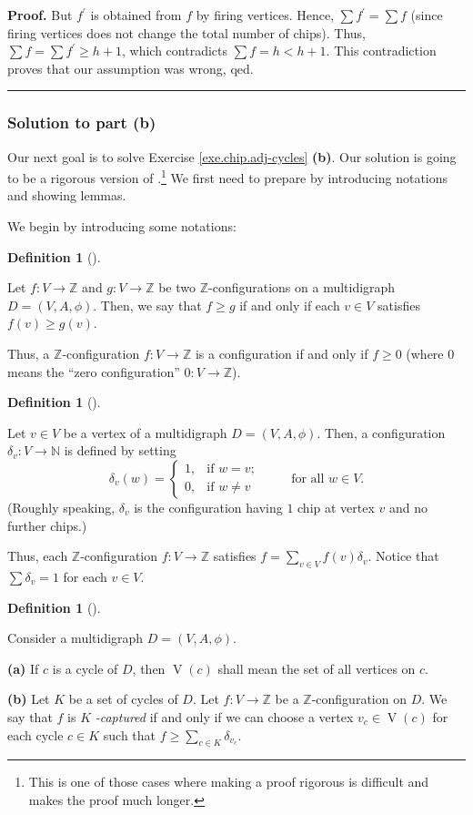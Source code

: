 \documentclass[numbers=enddot,12pt,final,onecolumn,notitlepage]{scrartcl}%
\theoremstyle{definition}
\newtheorem{defi}[theo]{Definition}
\newenvironment{definition}[1][]
{\begin{defi}[#1]\begin{leftbar}}
{\end{leftbar}\end{defi}}
\newenvironment{proof}[1][Proof]{\noindent\textbf{#1.} }{\ \rule{0.5em}{0.5em}}
\let\sumnonlimits\sum
\renewcommand{\sum}{\sumnonlimits\limits}
\newcommand{\ZZ}{\mathbb{Z}}
\newcommand{\tup}[1]{\left( #1 \right)}
\begin{document}
\begin{proof}
But $f^{\prime}$ is obtained from $f$ by firing vertices. Hence, $\sum
f^{\prime}=\sum f$ (since firing vertices does not change the total number of
chips). Thus, $\sum f=\sum f^{\prime}\geq h+1$, which contradicts $\sum
f=h<h+1$. This contradiction proves that our assumption was wrong, qed.
\end{proof}

\subsubsection{Solution to part \textbf{(b)}}

Our next goal is to solve Exercise \ref{exe.chip.adj-cycles} \textbf{(b)}.
Our solution is going to be a rigorous version of
\cite[proof of Theorem 2.2]{BjoLov92}.\footnote{This is one of
  those cases where
  making a proof rigorous is difficult and makes the proof
  much longer.}
We first need to prepare by introducing notations and showing lemmas.

We begin by introducing some notations:

\begin{definition}
Let $f : V \to \ZZ$ and $g : V \to \ZZ$ be two
$\ZZ$-configurations on a multidigraph $D = \tup{V, A, \phi}$.
Then, we say that $f\geq g$ if and only if each $v \in V$
satisfies $f \tup{v} \geq g \tup{v}$.
\end{definition}

Thus, a $\ZZ$-configuration $f : V \to \ZZ$ is a
configuration if and only if $f \geq 0$ (where $0$ means the
``zero configuration'' $0 : V \to \ZZ$).

\begin{definition}
Let $v\in V$ be a vertex of a multidigraph $D=\left(  V,A,\phi
\right)  $. Then, a configuration $\delta_{v}:V\rightarrow\mathbb{N}$ is
defined by setting
\[
\delta_{v}\left(  w\right)  =%
\begin{cases}
1, & \text{if }w=v;\\
0, & \text{if }w\neq v
\end{cases}
\qquad\text{ for all }w\in V.
\]
(Roughly speaking, $\delta_{v}$ is the configuration having $1$ chip at vertex
$v$ and no further chips.)
\end{definition}

Thus, each $\ZZ$-configuration $f:V\rightarrow\ZZ$ satisfies
$f=\sum_{v\in V}f\left(  v\right)  \delta_{v}$. Notice that $\sum\delta_{v}=1$
for each $v\in V$.

\begin{definition}
\label{def.chip.adj-cycles.K-captured}Consider a multidigraph
$D=\left(  V,A,\phi\right)  $.

\textbf{(a)} If $c$ is a cycle of $D$, then $\operatorname*{V}\left(
c\right)  $ shall mean the set of all vertices on $c$.

\textbf{(b)} Let $K$ be a set of cycles of $D$. Let $f:V\rightarrow\ZZ$
be a $\ZZ$-configuration on $D$. We say that $f$ is $K$%
\textit{-captured} if and only if we can choose a vertex $v_{c}\in
\operatorname*{V}\left(  c\right)  $ for each cycle $c\in K$ such that
$f\geq\sum_{c\in K}\delta_{v_c}$.
\end{definition}
\end{document}
